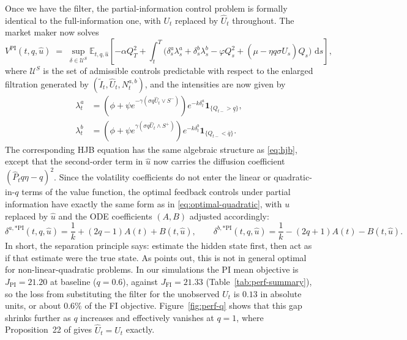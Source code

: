 \documentclass[11pt,a4paper]{article}
\theoremstyle{plain}
\theoremstyle{definition}
\newcommand{\E}{\mathbb{E}}
\newcommand{\dd}{\,\mathrm{d}}
\begin{document}
Once we have the filter, the partial-information control problem is
formally identical to the full-information one, with $U_t$ replaced by
$\hat{U}_t$ throughout. The market maker now solves
\begin{equation}
\label{eq:value-pi}
  V^{\mathrm{PI}}(t,q,\hat{u}) \;=\;
  \sup_{\delta\in\mathcal{U}^S}
  \E_{t,q,\hat{u}}\!\left[
    -\alpha Q_T^2 + \!\int_t^T\!\!\bigl(\delta^a_s\lambda^a_s+\delta^b_s\lambda^b_s
      - \varphi Q_s^2 + (\mu-\eta q\sigma\hat{U}_s)Q_s\bigr)\,\dd s\right],
\end{equation}
where $\mathcal{U}^S$ is the set of admissible controls predictable with
respect to the enlarged filtration generated by
$(\tilde{I}_t,\hat{U}_t,N^{a,b}_t)$, and the intensities are now given by
\cite{barucci2025market}
\begin{align*}
  \lambda^a_t &= (\phi + \psi e^{-\gamma(\sigma q\hat{U}_t\vee S^-)})
        e^{-k\delta^a_t}\mathbf{1}_{\{Q_{t-}>\underline{q}\}},\\
  \lambda^b_t &= (\phi + \psi e^{\gamma(\sigma q\hat{U}_t\wedge S^+)})
        e^{-k\delta^b_t}\mathbf{1}_{\{Q_{t-}<\bar{q}\}}.
\end{align*}
The corresponding HJB equation has the same algebraic structure as
\eqref{eq:hjb}, except that the second-order term in $\hat{u}$ now carries
the diffusion coefficient $(\hat{P}_t q\eta - q)^2$. Since the volatility
coefficients do not enter the linear or quadratic-in-$q$ terms of the value
function, the optimal feedback controls under partial information have
exactly the same form as in \eqref{eq:optimal-quadratic}, with $u$
replaced by $\hat{u}$ and the ODE coefficients $(A,B)$ adjusted
accordingly:
\begin{equation}
\label{eq:optimal-PI}
  \delta^{a,*\mathrm{PI}}(t,q,\hat{u}) = \frac{1}{k} + (2q-1)A(t) + B(t,\hat{u}),
  \qquad
  \delta^{b,*\mathrm{PI}}(t,q,\hat{u}) = \frac{1}{k} - (2q+1)A(t) - B(t,\hat{u}).
\end{equation}
In short, the separation principle says: estimate the hidden state first,
then act as if that estimate were the true state. As \cite{barucci2025market} points out, this is not in general
optimal for non-linear-quadratic problems. In our simulations the PI
mean objective is $J_{\mathrm{PI}}=21.20$ at baseline ($q=0.6$), against
$J_{\mathrm{FI}}=21.33$ (Table~\ref{tab:perf-summary}), so the loss from
substituting the filter for the unobserved $U_t$ is $0.13$ in absolute
units, or about $0.6\%$ of the FI objective. Figure~\ref{fig:perf-q}
shows that this gap shrinks further as $q$ increases and effectively
vanishes at $q=1$, where Proposition~22 of \cite{barucci2025market}
gives $\hat{U}_t = U_t$ exactly.
\end{document}
